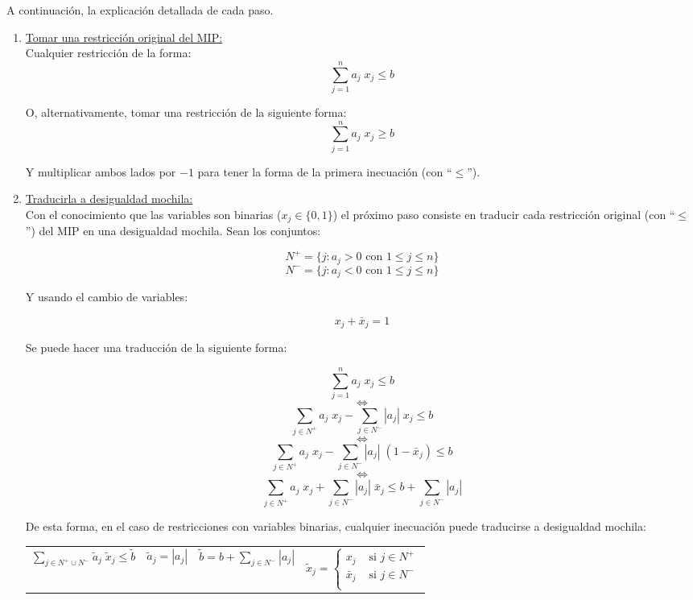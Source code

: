 A continuación, la explicación detallada de cada paso.
\newpage

\begin{enumerate}[ 1{)} ]
\item \underline{Tomar una restricción original del MIP:}\\
Cualquier restricción de la forma:
$$\overset{n}{\underset{j=1}{\sum}} a_j\;x_j \leq b$$

O, alternativamente, tomar una restricción de la siguiente forma:
$$\overset{n}{\underset{j=1}{\sum}} a_j\;x_j \geq b$$

Y multiplicar ambos lados por $-1$ para tener la forma de la primera inecuación (con ``$\leq$'').

\item \underline{Traducirla a desigualdad mochila:}\\
Con el conocimiento que las variables son binarias ($x_j\in\{0,1\}$) el próximo paso consiste en traducir cada restricción original (con ``$\leq$'') del MIP en una desigualdad mochila. Sean los conjuntos:

$$N^+ = \{j: a_j > 0 \text{ con } 1\leq j \leq n\}$$
$$N^- = \{j: a_j < 0 \text{ con } 1\leq j \leq n\}$$

Y usando el cambio de variables:

$$x_j + \bar{x}_j = 1$$

Se puede hacer una traducción de la siguiente forma:

$$\overset{n}{\underset{j=1}{\sum}} a_j\;x_j \leq b$$
$$\Leftrightarrow$$
$$\overset{}{\underset{j \in N^+}{\sum}} a_j\;x_j - \overset{}{\underset{j \in N^-}{\sum}} |a_j|\;x_j \leq b$$
$$\Leftrightarrow$$
$$\overset{}{\underset{j \in N^+}{\sum}} a_j\;x_j - \overset{}{\underset{j \in N^-}{\sum}} |a_j|\;(1-\bar{x}_j) \leq b$$
$$\Leftrightarrow$$
$$\overset{}{\underset{j \in N^+}{\sum}} a_j\;x_j + \overset{}{\underset{j \in N^-}{\sum}} |a_j|\;\bar{x}_j \leq b + \overset{}{\underset{j \in N^-}{\sum}} |a_j|$$

De esta forma, en el caso de restricciones con variables binarias, cualquier inecuación puede traducirse a desigualdad mochila:

{
\centering
\begin{tabular}{p{4cm}p{2cm}p{3cm}p{4cm}}
$\overset{}{\underset{j \in N^+ \cup N^-}{\sum}} \tilde{a}_j\;\tilde{x}_j \leq \tilde{b}$
&
$\tilde{a}_j = |a_j|$
&
$\tilde{b} = b + \overset{}{\underset{j \in N^-}{\sum}} |a_j|$
&
$\tilde{x}_j = 
\begin{cases}
x_j & \text{ si } j \in N^+\\
\bar{x}_j & \text{ si } j \in N^-\\
\end{cases}$\\
\end{tabular}\\
\vspace{5mm}
}


\end{enumerate}
